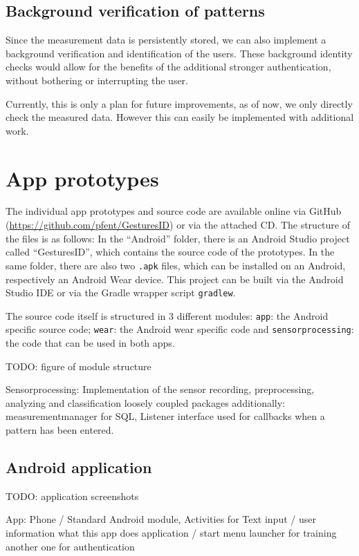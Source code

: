 \subsection{Background verification of patterns}
Since the measurement data is persistently stored, we can also implement a background verification and identification of the users. These background identity checks would allow for the benefits of the additional stronger authentication, without bothering or interrupting the user.

Currently, this is only a plan for future improvements, as of now, we only directly check the measured data. However this can easily be implemented with additional work.
\section{App prototypes}
The individual app prototypes and source code are available online via GitHub (\url{https://github.com/pfent/GesturesID}) or via the attached CD. The structure of the files is as follows: In the ``Android'' folder, there is an Android Studio project called ``GesturesID'', which contains the source code of the prototypes. In the same folder, there are also two \lstinline$.apk$ files, which can be installed on an Android, respectively an Android Wear device. This project can be built via the Android Studio IDE or via the Gradle wrapper script \lstinline$gradlew$.

The source code itself is structured in 3 different modules: \lstinline$app$: the Android specific source code; \lstinline$wear$: the Android wear specific code and \lstinline$sensorprocessing$: the code that can be used in both apps.

TODO: figure of module structure

Sensorprocessing: Implementation of the sensor recording, preprocessing, analyzing and classification
loosely coupled packages
additionally: measurementmanager for SQL, Listener interface used for callbacks when a pattern has been entered.

\subsection{Android application}
TODO: application screenshots

App: Phone / Standard Android module, Activities for Text input / user information what this app does
application / start menu launcher for training
another one for authentication

